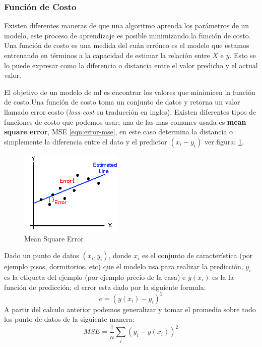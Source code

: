 \subsubsection{Función de Costo}
Existen diferentes maneras de que una algoritmo aprenda los parámetros de un modelo, este proceso de aprendizaje es posible minimizando la función de costo. Una función de costo es una medida del cuán erróneo es el modelo que estamos entrenando en términos a la capacidad de estimar la relación entre $X $ e $y $. Esto se lo puede expresar como la diferencia o distancia entre el valor predicho y el actual valor.

El objetivo de un modelo de \ac{ml} es encontrar los valores que minimicen la función de costo.Una función de costo toma un conjunto de datos y retorna un valor llamado error costo (\textit{loss cost} su traducción en ingles). Existen diferentes tipos de funciones de costo que podemos usar; una de las mas comunes usada es \textbf{mean square error}, MSE \ref{eqn:error-mse}, en este caso determina la distancia o simplemente la diferencia entre el dato y el predictor $(x_i - y_i) $ ver figura: \ref{Fig:mse}.
\begin{figure}[H] \centering
  \includegraphics[height=4cm,keepaspectratio=true,clip=true]{imagenes/MarcoTeorico/mse-cost.png}
  \caption{Mean Square Error }\label{Fig:mse}
\end{figure}

Dado un punto de datos $(x_i,y_i) $, donde $x_i $ es el conjunto de característica (por ejemplo pisos, dormitorios, etc) que el modelo usa para realizar la predicción, $y_i $ es la etiqueta del ejemplo (por ejemplo precio de la casa) e $y(x_i)$ es la la función de predicción; el error esta dado por la siguiente formula:
\begin{equation}\label{eqn:error-mse}
e = (y(x_i) - y_i)^2
\end{equation} 
A partir del calculo anterior podemos generalizar y tomar el promedio sobre todo los punto de datos de la siguiente manera:
\begin{equation}
MSE =  \frac{1}{n}\sum_{i}(y_i - y(x_i))^2
\end{equation}

